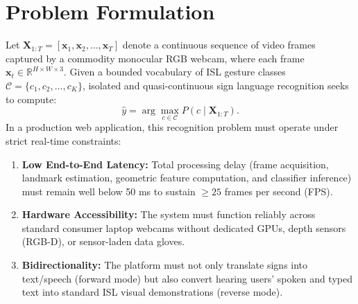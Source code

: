 \section{Problem Formulation}
Let $\mathbf{X}_{1:T} = [\mathbf{x}_1, \mathbf{x}_2, \ldots, \mathbf{x}_T]$ denote a continuous sequence of video frames captured by a commodity monocular RGB webcam, where each frame $\mathbf{x}_t \in \mathbb{R}^{H \times W \times 3}$. Given a bounded vocabulary of ISL gesture classes $\mathcal{C} = \{c_1, c_2, \ldots, c_K\}$, isolated and quasi-continuous sign language recognition seeks to compute:
\[
\hat{y} = \arg\max_{c \in \mathcal{C}} P(c \mid \mathbf{X}_{1:T}).
\]
In a production web application, this recognition problem must operate under strict real-time constraints:
\begin{enumerate}
\item \textbf{Low End-to-End Latency:} Total processing delay (frame acquisition, landmark estimation, geometric feature computation, and classifier inference) must remain well below 50 ms to sustain $\ge 25$ frames per second (FPS).
\item \textbf{Hardware Accessibility:} The system must function reliably across standard consumer laptop webcams without dedicated GPUs, depth sensors (RGB-D), or sensor-laden data gloves.
\item \textbf{Bidirectionality:} The platform must not only translate signs into text/speech (forward mode) but also convert hearing users' spoken and typed text into standard ISL visual demonstrations (reverse mode).
\end{enumerate}

